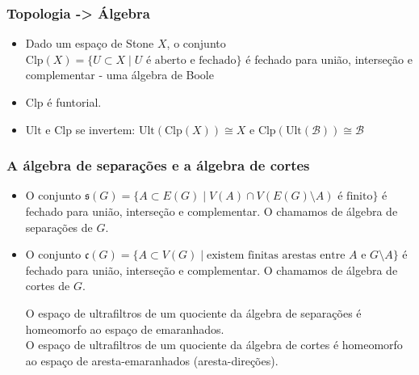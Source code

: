\begin{frame}{}
\frametitle{Topologia -> Álgebra}
    \begin{itemize}
        \item Dado um espaço de Stone $X$, o conjunto $\text{Clp}(X) = \{U \subset X \mid U \text{ é aberto e fechado}\}$ é fechado para união, interseção e complementar - uma álgebra de Boole \pause
        \item $\text{Clp}$ é funtorial. \pause
        \item $\text{Ult}$ e $\text{Clp}$ se invertem: $\text{Ult}(\text{Clp}(X)) \cong X$  e $\text{Clp}(\text{Ult}(\mathcal{B})) \cong \mathcal{B}$
    \end{itemize} 
\end{frame}

\begin{frame}{}
\frametitle{A álgebra de separações e a álgebra de cortes}
    \begin{itemize}
        \item O conjunto $\mathfrak{s}(G) = \{A \subset E(G) \mid V(A) \cap V(E(G) \setminus A) \text{ é finito}\}$ é fechado para união, interseção e complementar. O chamamos de álgebra de separações de $G$. \pause
        \item O conjunto $\mathfrak{c}(G) = \{A \subset V(G) \mid \text{existem finitas arestas entre } A \text{ e } G \setminus A\}$ é fechado para união, interseção e complementar. O chamamos de álgebra de cortes de $G$. \pause
    \begin{theorem}
        O espaço de ultrafiltros de um quociente da álgebra de separações é homeomorfo ao espaço de emaranhados.\\
        O espaço de ultrafiltros de um quociente da álgebra de cortes é homeomorfo ao espaço de aresta-emaranhados (aresta-direções).
    \end{theorem}
    \end{itemize} 
\end{frame}

